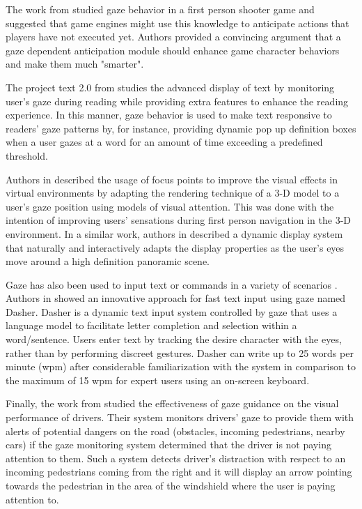 \documentclass[]{article}
\begin{document}
The work from \cite{Koesling2011} studied gaze behavior in a first person shooter game and suggested that game engines
might use this knowledge to anticipate actions that players have not executed yet. Authors provided a convincing
argument that a gaze dependent anticipation module should enhance game character behaviors and make them much "smarter".


The project text 2.0 from \cite{Biedert2010} studies the advanced display of text by monitoring user's gaze during
reading while providing extra features to enhance the reading experience. In this manner, gaze behavior is used to make
text responsive to readers' gaze patterns by, for instance, providing dynamic pop up definition boxes when a user gazes
at a word for an amount of time exceeding a predefined threshold.


Authors in \cite{Hillaire2008} described the usage of focus points to improve the visual effects in virtual environments
by adapting the rendering technique of a 3-D model to a user's gaze position using models of visual attention. This was
done with the intention of improving users' sensations during first person navigation in the 3-D environment.
In a similar work, authors in \cite{Rahardja2009} described a dynamic display system that naturally and interactively
adapts the display properties as the user's eyes move around a high definition panoramic scene.


Gaze has also been used to input text or commands in a variety of scenarios \cite{myiwann2011}. Authors in
\cite{fasthandsfreewritingbygaze} showed an innovative approach for fast text input using gaze named Dasher. Dasher is a
dynamic text input system controlled by gaze that uses a language model to facilitate letter completion and selection
within a word/sentence. Users enter text by tracking the desire character with the eyes, rather than by performing
discreet gestures. Dasher can write up to 25 words per minute (wpm) after considerable familiarization with the system
in comparison to the maximum of 15 wpm for expert users using an on-screen keyboard.
 

Finally, the work from \cite{Pomarjanschi2012} studied the effectiveness of gaze guidance on the visual performance of
drivers. Their system monitors drivers' gaze to provide them with alerts of potential dangers on the road (obstacles,
incoming pedestrians, nearby cars) if the gaze monitoring system determined that the driver is not paying attention to
them. Such a system detects driver's distraction with respect to an incoming pedestrians coming from the right and it
will display an arrow pointing towards the pedestrian in the area of the windshield where the user is paying attention
to.
\end{document}
